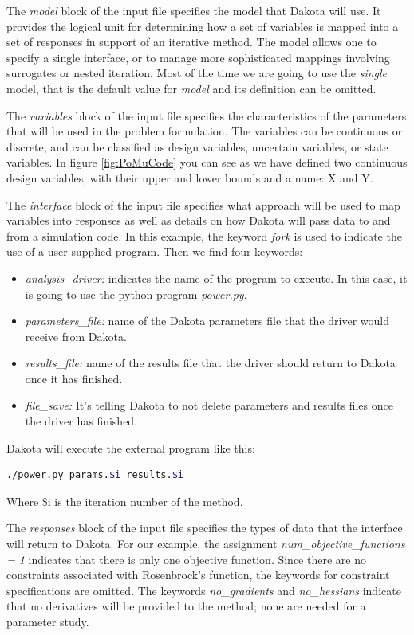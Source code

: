 \documentclass[12pt,a4paper,article]{memoir}
\begin{document}
The \textit{model} block of the input file specifies the model that Dakota will use. It provides the logical unit for determining how a set of variables is mapped into a set of responses in support of an iterative method. The model allows one to specify a single interface, or to manage more sophisticated mappings involving surrogates or nested iteration. 
Most of the time we are going to use the \textit{single} model, that is the default value for \textit{model} and its definition can be omitted.

The \textit{variables} block of the input file specifies the characteristics of the parameters that will be used in the problem formulation. The variables can be continuous or discrete, and can be classified as design variables, uncertain variables, or state variables. In figure \ref{fig:PoMuCode} you can see as we have defined two continuous design variables, with their upper and lower bounds and a name: X and Y.

The \textit{interface} block of the input file specifies what approach will be used to map variables into responses as well as details on how Dakota will pass data to and from a simulation code. In this example, the keyword \textit{fork} is used to indicate the use of a user-supplied program. Then we find four keywords: 

\begin{itemize}
\item \textit{analysis\_driver:} indicates the name of the program to execute. In this case, it is going to use the python program \textit{power.py}. 
\item \textit{parameters\_file:} name of the Dakota parameters file that the driver would receive from Dakota.
\item \textit{results\_file:} name of the results file that the driver should return to Dakota once it has finished.
\item \textit{file\_save:} It's telling Dakota to not delete parameters and results files once the driver has finished.
\end{itemize}

Dakota will execute the external program like this:

\begin{lstlisting}[style=MyCodeStyle,language=bash]
./power.py params.$i results.$i
\end{lstlisting}

Where \$i is the iteration number of the method.

The \textit{responses} block of the input file specifies the types of data that the interface will return to Dakota. For our example, the assignment \textit{num\_objective\_functions = 1} indicates that there is only one objective function. Since there are no constraints associated with Rosenbrock's function, the keywords for constraint specifications are omitted. The keywords \textit{no\_gradients} and \textit{no\_hessians} indicate that no
derivatives will be provided to the method; none are needed for a parameter study.
\end{document}
